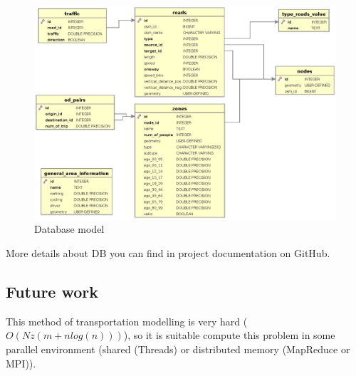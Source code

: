 \begin{figure}
\centering
\includegraphics[width=15cm]{img/c01-transp-model/db.eps}
\caption{Database model}
\label{img.schema}
\end{figure}

More details about DB you can find in project documentation on GitHub.

\subsection{Future work}
This method of transportation modelling is very hard ($O(N z (m + n log(n)))$), so it is suitable compute this problem in some parallel environment (shared (Threads) or distributed memory (MapReduce or MPI)).

